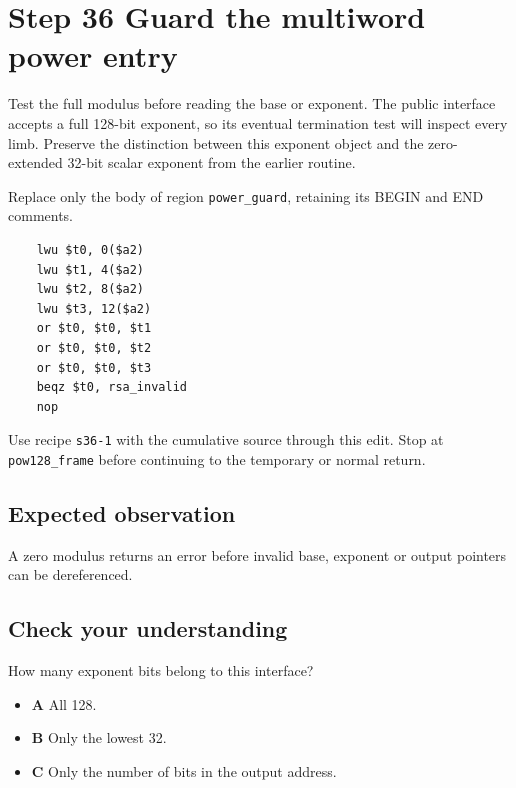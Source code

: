 \section{Step 36 Guard the multiword power entry}\label{rsa-s36}

Test the full modulus before reading the base or exponent. The public interface accepts a full 128-bit exponent, so its eventual termination test will inspect every limb. Preserve the distinction between this exponent object and the zero-extended 32-bit scalar exponent from the earlier routine.

Replace only the body of region \texttt{power\_guard}, retaining its BEGIN and END comments.

\begin{verbatim}
    lwu $t0, 0($a2)
    lwu $t1, 4($a2)
    lwu $t2, 8($a2)
    lwu $t3, 12($a2)
    or $t0, $t0, $t1
    or $t0, $t0, $t2
    or $t0, $t0, $t3
    beqz $t0, rsa_invalid
    nop
\end{verbatim}

Use recipe \texttt{s36-1} with the cumulative source through this edit. Stop at \texttt{pow128\_frame} before continuing to the temporary or normal return.

\subsection{Expected observation}
A zero modulus returns an error before invalid base, exponent or output pointers can be dereferenced.

\subsection{Check your understanding}
How many exponent bits belong to this interface?

\begin{itemize}
\item \textbf{A} All 128.
\item \textbf{B} Only the lowest 32.
\item \textbf{C} Only the number of bits in the output address.
\end{itemize}

